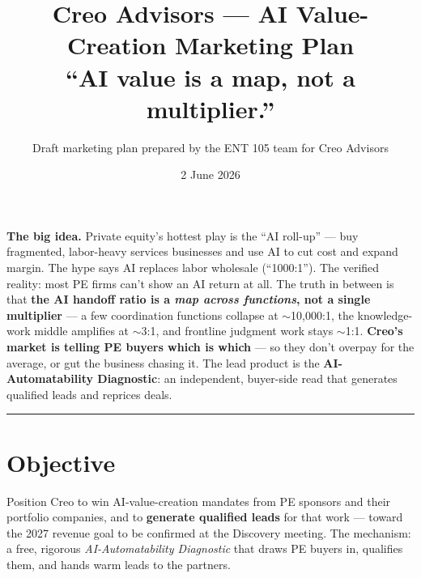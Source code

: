 \documentclass[11pt]{article}
\title{\textbf{\color{creonavy} Creo Advisors --- AI Value-Creation Marketing Plan}\\[3pt]
\large ``AI value is a map, not a multiplier.''}
\author{\normalsize Draft marketing plan prepared by the ENT 105 team for Creo Advisors}
\date{\normalsize 2 June 2026}
\begin{document}
\maketitle
\vspace{-1.2em}

\begin{bigidea}
\textbf{The big idea.} Private equity's hottest play is the ``AI roll-up'' --- buy fragmented,
labor-heavy services businesses and use AI to cut cost and expand margin. The hype says AI
replaces labor wholesale (``1000:1''). The verified reality: most PE firms can't show an AI
return at all. The truth in between is that \textbf{the AI handoff ratio is a \emph{map across
functions}, not a single multiplier} --- a few coordination functions collapse at $\sim$10{,}000:1,
the knowledge-work middle amplifies at $\sim$3:1, and frontline judgment work stays $\sim$1:1.
\textbf{Creo's market is telling PE buyers which is which} --- so they don't overpay for the
average, or gut the business chasing it. The lead product is the \textbf{AI-Automatability
Diagnostic}: an independent, buyer-side read that generates qualified leads and reprices deals.
\end{bigidea}

\tableofcontents
\vspace{0.5em}\hrule\vspace{0.7em}

\section{Objective}
Position Creo to win AI-value-creation mandates from PE sponsors and their portfolio companies,
and to \textbf{generate qualified leads} for that work --- toward the 2027 revenue goal to be
confirmed at the Discovery meeting. The mechanism: a free, rigorous \emph{AI-Automatability
Diagnostic} that draws PE buyers in, qualifies them, and hands warm leads to the partners.

\end{document}
